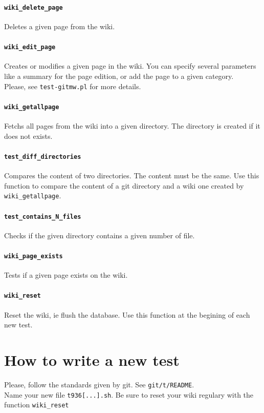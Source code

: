 \documentclass[11pt]{article}
\begin{document}
\paragraph*{\lstinline!wiki_delete_page!}
Deletes a given page from the wiki.

\paragraph*{\lstinline!wiki_edit_page!}
Creates or modifies a given page in the wiki. You can specify several
parameters like a summary for the page edition, or add the page to a
given category.\\
Please, see \lstinline!test-gitmw.pl! for more details.

\paragraph*{\lstinline!wiki_getallpage!}
Fetchs all pages from the wiki into a given directory. The directory
is created if it does not exists.

\paragraph*{\lstinline!test_diff_directories!}
Compares the content of two directories. The content must be the same.
Use this function to compare the content of a git directory and a wiki
one created by \lstinline!wiki_getallpage!.

\paragraph*{\lstinline!test_contains_N_files!}
Checks if the given directory contains a given number of file.

\paragraph*{\lstinline!wiki_page_exists!}
Tests if a given page exists on the wiki.

\paragraph*{\lstinline!wiki_reset!}
Reset the wiki, ie flush the database. Use this function at the
begining of each new test.

\section{How to write a new test}
Please, follow the standards given by git. See \lstinline!git/t/README!.\\
Name your new file \lstinline!t936[...].sh!.
Be sure to reset your wiki regulary with the function \lstinline!wiki_reset!
\end{document}
